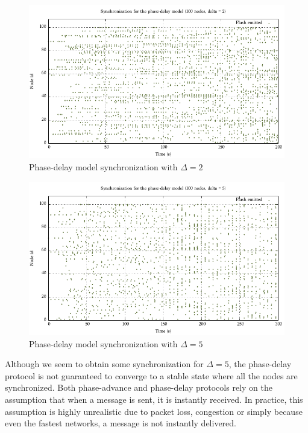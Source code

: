 \documentclass[a4paper, 11pt]{article}
\theoremstyle{plain}
\theoremstyle{definition}
\begin{document}
     \begin{figure}[h]
       \centering
       \includegraphics[width=\textwidth]{../Plots/Firefly-pd-100nodes-2-4.pdf}
       \caption{Phase-delay model synchronization with $\Delta = 2$}
       \label{fig:pd-sync-d2}
     \end{figure}

      \begin{figure}[h]
       \centering
       \includegraphics[width=\textwidth]{../Plots/Firefly-pd-100nodes-5-5.pdf}
       \caption{Phase-delay model synchronization with $\Delta = 5$}
       \label{fig:pd-sync-d5}
     \end{figure}
     
     Although we seem to obtain some synchronization for $\Delta = 5$, the phase-delay protocol is not
     guaranteed to converge to a stable state where all the nodes are synchronized. Both phase-advance and
     phase-delay protocols rely on the assumption that when a message is sent, it is instantly received. In
     practice, this assumption is highly unrealistic due to packet loss, congestion or simply because even the
     fastest networks, a message is not instantly delivered.
\end{document}
